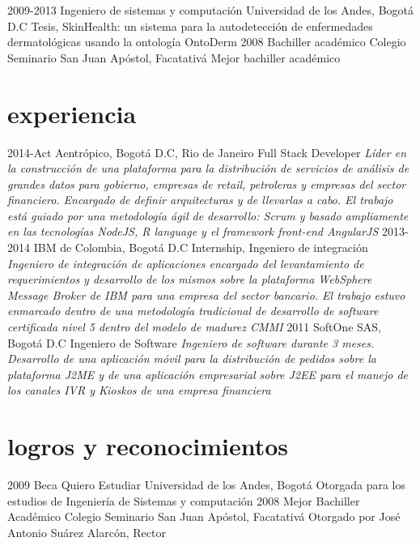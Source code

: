\documentclass[]{friggeri-cv}
\begin{document}
\begin{entrylist}
  \entry
    {2009-2013}
    {Ingeniero de sistemas y computación}
    {Universidad de los Andes, Bogotá D.C}
    {Tesis, SkinHealth: un sistema para la autodetección de enfermedades dermatológicas usando la ontología OntoDerm}
  \entry
    {2008}
    {Bachiller académico}
    {Colegio Seminario San Juan Apóstol, Facatativá}
    {Mejor bachiller académico}
\end{entrylist}


\section{experiencia}

\begin{entrylist}
  \entry
    {2014-Act}
    {Aentrópico, Bogotá D.C, Rio de Janeiro}
    {Full Stack Developer}
    {\emph{Líder en la construcción de una plataforma para la distribución de servicios de análisis de grandes datos para gobierno, empresas de retail, petroleras y empresas del sector financiero. Encargado de definir arquitecturas y de llevarlas a cabo. El trabajo está guiado por una metodología ágil de desarrollo: Scrum y basado ampliamente en las tecnologías NodeJS, R language y el framework front-end AngularJS}}
  \entry
    {2013-2014}
    {IBM de Colombia, Bogotá D.C}
    {Internship, Ingeniero de integración}
    {\emph{Ingeniero de integración de aplicaciones encargado del levantamiento de requerimientos y desarrollo de los mismos sobre la plataforma WebSphere Message Broker de IBM para una empresa del sector bancario. El trabajo estuvo enmarcado dentro de una metodología tradicional de desarrollo de software certificada nivel 5 dentro del modelo de madurez CMMI}}
  \entry
    {2011}
    {SoftOne SAS, Bogotá D.C}
    {Ingeniero de Software}
    {\emph{Ingeniero de software durante 3 meses. Desarrollo de una aplicación móvil para la distribución de pedidos sobre la plataforma J2ME y de una aplicación empresarial sobre J2EE para el manejo de los canales IVR y Kioskos de una empresa financiera}}
\end{entrylist}


\section{logros y reconocimientos}

\begin{entrylist}
  \entry
    {2009}
    {Beca Quiero Estudiar}
    {Universidad de los Andes, Bogotá}
    {Otorgada para los estudios de Ingeniería de Sistemas y computación}
  \entry
    {2008}
    {Mejor Bachiller Académico}
    {Colegio Seminario San Juan Apóstol, Facatativá}
    {Otorgado por José Antonio Suárez Alarcón, Rector}
\end{entrylist}
\end{document}
